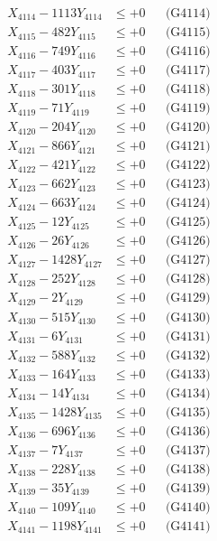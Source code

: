 \documentclass[a4paper,10pt]{article}
\begin{document}
{\begin{align}
X_{4114} - 1113Y_{4114} &\leq +0 && \text{(G4114)} \\
X_{4115} - 482Y_{4115} &\leq +0 && \text{(G4115)} \\
X_{4116} - 749Y_{4116} &\leq +0 && \text{(G4116)} \\
X_{4117} - 403Y_{4117} &\leq +0 && \text{(G4117)} \\
X_{4118} - 301Y_{4118} &\leq +0 && \text{(G4118)} \\
X_{4119} - 71Y_{4119} &\leq +0 && \text{(G4119)} \\
X_{4120} - 204Y_{4120} &\leq +0 && \text{(G4120)} \\
\allowbreak
X_{4121} - 866Y_{4121} &\leq +0 && \text{(G4121)} \\
X_{4122} - 421Y_{4122} &\leq +0 && \text{(G4122)} \\
X_{4123} - 662Y_{4123} &\leq +0 && \text{(G4123)} \\
X_{4124} - 663Y_{4124} &\leq +0 && \text{(G4124)} \\
X_{4125} - 12Y_{4125} &\leq +0 && \text{(G4125)} \\
X_{4126} - 26Y_{4126} &\leq +0 && \text{(G4126)} \\
X_{4127} - 1428Y_{4127} &\leq +0 && \text{(G4127)} \\
X_{4128} - 252Y_{4128} &\leq +0 && \text{(G4128)} \\
X_{4129} - 2Y_{4129} &\leq +0 && \text{(G4129)} \\
X_{4130} - 515Y_{4130} &\leq +0 && \text{(G4130)} \\
\allowbreak
X_{4131} - 6Y_{4131} &\leq +0 && \text{(G4131)} \\
X_{4132} - 588Y_{4132} &\leq +0 && \text{(G4132)} \\
X_{4133} - 164Y_{4133} &\leq +0 && \text{(G4133)} \\
X_{4134} - 14Y_{4134} &\leq +0 && \text{(G4134)} \\
X_{4135} - 1428Y_{4135} &\leq +0 && \text{(G4135)} \\
X_{4136} - 696Y_{4136} &\leq +0 && \text{(G4136)} \\
X_{4137} - 7Y_{4137} &\leq +0 && \text{(G4137)} \\
X_{4138} - 228Y_{4138} &\leq +0 && \text{(G4138)} \\
X_{4139} - 35Y_{4139} &\leq +0 && \text{(G4139)} \\
X_{4140} - 109Y_{4140} &\leq +0 && \text{(G4140)} \\
\allowbreak
X_{4141} - 1198Y_{4141} &\leq +0 && \text{(G4141)} \\

\end{align}}
\end{document}
